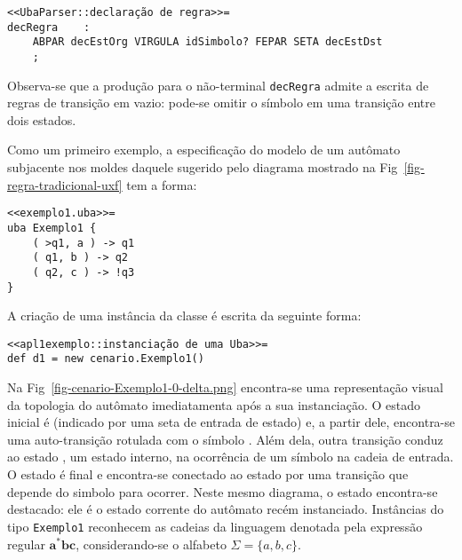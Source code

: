 \begin{lstlisting}[style=antlr]
<<UbaParser::declaração de regra>>=
decRegra	:
	ABPAR decEstOrg VIRGULA idSimbolo? FEPAR SETA decEstDst
	;
\end{lstlisting}

\noindent
Observa-se que a produção para o não-terminal \lstinline[style=antlr]!decRegra! admite a escrita de regras de transição em vazio: pode-se omitir o símbolo em uma transição entre dois estados.

Como um primeiro exemplo, a especificação do modelo de um autômato subjacente nos moldes daquele sugerido pelo diagrama mostrado na Fig~\ref{fig-regra-tradicional-uxf} tem a forma:

\begin{lstlisting}
<<exemplo1.uba>>=
uba Exemplo1 {
	( >q1, a ) -> q1
	( q1, b ) -> q2
	( q2, c ) -> !q3
}
\end{lstlisting}

\noindent
A criação de uma instância  da classe  é escrita da seguinte forma:

\begin{lstlisting}
<<apl1exemplo::instanciação de uma Uba>>=
def d1 = new cenario.Exemplo1()
\end{lstlisting}

\noindent
Na Fig~\ref{fig-cenario-Exemplo1-0-delta.png} encontra-se uma representação visual da topologia do autômato imediatamenta após a sua instanciação. O estado inicial é  (indicado por uma seta de entrada de estado) e, a partir dele, encontra-se uma auto-transição rotulada com o símbolo . Além dela, outra transição conduz ao estado , um estado interno, na ocorrência de um símbolo  na cadeia de entrada. O estado  é final e encontra-se conectado ao estado  por uma transição que depende do simbolo  para ocorrer. Neste mesmo diagrama, o estado  encontra-se destacado: ele é o estado corrente do autômato recém instanciado. Instâncias do tipo \lstinline!Exemplo1! reconhecem as cadeias da linguagem denotada pela expressão regular $\mathbf{a^*bc}$, considerando-se o alfabeto $\Sigma=\{a, b, c\}$.


